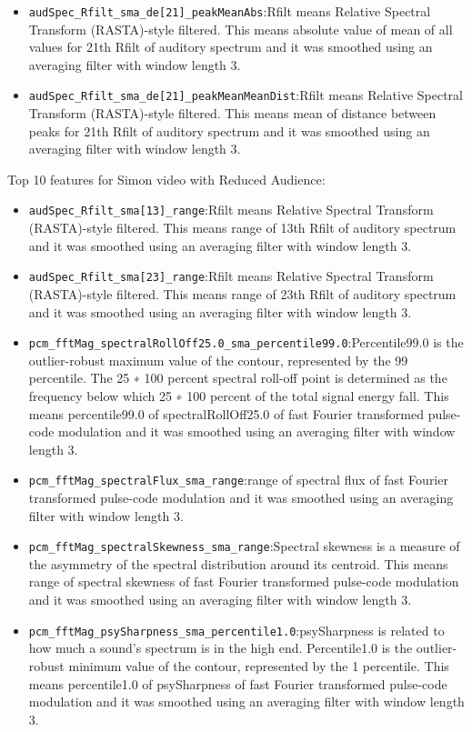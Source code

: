 \begin{itemize}
\item \verb|audSpec_Rfilt_sma_de[21]_peakMeanAbs|:Rfilt means Relative Spectral Transform (RASTA)-style filtered. This means absolute value of mean of all values for 21th Rfilt of auditory spectrum and it was smoothed using an averaging filter with window length 3.
\item \verb|audSpec_Rfilt_sma_de[21]_peakMeanMeanDist|:Rfilt means Relative Spectral Transform (RASTA)-style filtered. This means mean of distance between peaks for 21th Rfilt of auditory spectrum and it was smoothed using an averaging filter with window length 3.
\end{itemize}

Top 10 features for Simon video with Reduced Audience:
\begin{itemize}
\item \verb|audSpec_Rfilt_sma[13]_range|:Rfilt means Relative Spectral Transform (RASTA)-style filtered. This means range of 13th Rfilt of auditory spectrum and it was smoothed using an averaging filter with window length 3.
\item \verb|audSpec_Rfilt_sma[23]_range|:Rfilt means Relative Spectral Transform (RASTA)-style filtered. This means range of 23th Rfilt of auditory spectrum and it was smoothed using an averaging filter with window length 3.
\item \verb|pcm_fftMag_spectralRollOff25.0_sma_percentile99.0|:Percentile99.0 is the outlier-robust maximum value of the contour, represented by the 99 percentile. The 25 ∗ 100 percent spectral roll-off point is determined as the frequency below which 25 ∗ 100 percent of the total signal energy fall. This means percentile99.0 of spectralRollOff25.0 of fast Fourier transformed pulse-code modulation and it was smoothed using an averaging filter with window length 3.
\item \verb|pcm_fftMag_spectralFlux_sma_range|:range of spectral flux of fast Fourier transformed pulse-code modulation and it was smoothed using an averaging filter with window length 3.
\item \verb|pcm_fftMag_spectralSkewness_sma_range|:Spectral skewness is a measure of the asymmetry of the spectral distribution around its centroid. This means range of spectral skewness of fast Fourier transformed pulse-code modulation and it was smoothed using an averaging filter with window length 3.
\item \verb|pcm_fftMag_psySharpness_sma_percentile1.0|:psySharpness is related to how much a sound’s spectrum is in the high end. Percentile1.0 is the outlier-robust minimum value of the contour, represented by the 1 percentile. This means percentile1.0 of psySharpness of fast Fourier transformed pulse-code modulation and it was smoothed using an averaging filter with window length 3.

\end{itemize}

